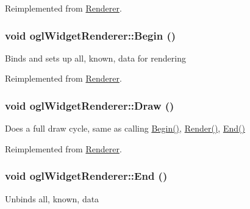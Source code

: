 Reimplemented from \hyperlink{class_renderer_661389d49db8d9508f5a3f9f91d48149}{Renderer}.\hypertarget{classogl_widget_renderer_1892829478f840e8a0d7032f94af6d26}{
\subsubsection[{Begin}]{\setlength{\rightskip}{0pt plus 5cm}void oglWidgetRenderer::Begin ()}}
\label{classogl_widget_renderer_1892829478f840e8a0d7032f94af6d26}


Binds and sets up all, known, data for rendering 

Reimplemented from \hyperlink{class_renderer_7f24c7de101eff6bd26906c0555f8610}{Renderer}.\hypertarget{classogl_widget_renderer_f4a8764df5f2b79e37d2a23cf268ed44}{
\subsubsection[{Draw}]{\setlength{\rightskip}{0pt plus 5cm}void oglWidgetRenderer::Draw ()}}
\label{classogl_widget_renderer_f4a8764df5f2b79e37d2a23cf268ed44}


Does a full draw cycle, same as calling \hyperlink{classogl_widget_renderer_1892829478f840e8a0d7032f94af6d26}{Begin()}, \hyperlink{classogl_widget_renderer_fb83427aa814bf2a18f3abded3161bc5}{Render()}, \hyperlink{classogl_widget_renderer_f4f9aab6b1dfc9888de5b9f0504be3e8}{End()} 

Reimplemented from \hyperlink{class_renderer_91f20cf8d7e9d12db1725cc15ca16d96}{Renderer}.\hypertarget{classogl_widget_renderer_f4f9aab6b1dfc9888de5b9f0504be3e8}{
\subsubsection[{End}]{\setlength{\rightskip}{0pt plus 5cm}void oglWidgetRenderer::End ()}}
\label{classogl_widget_renderer_f4f9aab6b1dfc9888de5b9f0504be3e8}


Unbinds all, known, data 

